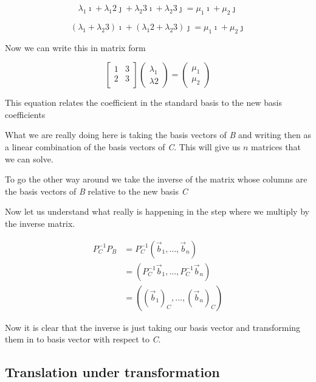 \[
    \lambda_1 \imath + \lambda_1 2 \jmath + \lambda_2 3 \imath + \lambda_2 3 \jmath = \mu_1 \imath + \mu_2 \jmath 
\]

\[
    (\lambda_1  +  \lambda_2 3)\imath + (\lambda_1 2  + \lambda_2 3) \jmath = \mu_1 \imath + \mu_2 \jmath 
\]

Now we can write this in matrix form

\[
    \begin{bmatrix}
        1 & 3 \\
        2 & 3 \\
    \end{bmatrix} \begin{pmatrix}
        \lambda_1 \\ \lambda2
    \end{pmatrix} = \begin{pmatrix}
        \mu_1 \\ \mu_2
    \end{pmatrix}
\]

This equation relates the coefficient in the standard basis to the new basis
coefficients
\vspace{\baselineskip}

What we are really doing here is taking the basis vectors of \emph{B} and writing then as a linear combination
of the basis vectors of \emph{C}. This will give us \(n\) matrices that we can solve.
\vspace{\baselineskip}

To go the other way around we take the inverse of the matrix whose columns are the basis vectors of \emph{B}
relative to the new basis \emph{C}
\vspace{\baselineskip}

Now let us understand what really is happening in the step where we multiply by the inverse matrix.

\begin{align*}
    P_{C}^{-1} P_B &= P_{C}^{-1}(\vec{b}_1, \dots, \vec{b}_n) \\
    &= (P_{C}^{-1}\vec{b}_1, \dots, P_{C}^{-1}\vec{b}_n)\\
    &= ({(\vec{b}_1)}_C, \dots, {(\vec{b}_n)}_C)
\end{align*}

Now it is clear that the inverse is just taking our basis vector and transforming
them in to basis vector with respect to \emph{C}.

\subsection{Translation under transformation}

